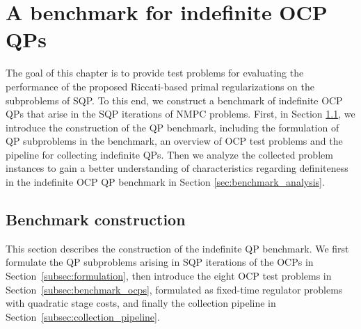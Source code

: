 \documentclass[class=scrbook, crop=false]{standalone}
\begin{document}
\chapter{A benchmark for indefinite OCP QPs} %
\label{Chapter::Benchmark}
The goal of this chapter is to provide test problems for evaluating the performance of the proposed Riccati-based primal regularizations
on the subproblems of \gls{SQP}.
To this end, we construct a benchmark of indefinite \gls{OCP} \glspl{QP}
that arise in the \gls{SQP} iterations of \gls{NMPC} problems.
First, in Section \ref{sec:benchmark_construction},
we introduce the construction of the \gls{QP} benchmark,
including the formulation of \gls{QP} subproblems in the benchmark, an overview of \gls{OCP} test problems 
and the pipeline for collecting indefinite \glspl{QP}.
Then we analyze the collected problem instances to gain a better understanding of characteristics
regarding definiteness in the indefinite \gls{OCP} \gls{QP} benchmark in Section \ref{sec:benchmark_analysis}.

\section{Benchmark construction}
\label{sec:benchmark_construction}
This section describes the construction of the indefinite \gls{QP} benchmark.
We first formulate the \gls{QP} subproblems arising in \gls{SQP} iterations of the \glspl{OCP} in Section~\ref{subsec:formulation},
then introduce the eight \gls{OCP} test problems in Section~\ref{subsec:benchmark_ocps},
formulated as fixed-time regulator problems with quadratic stage costs,
and finally the collection pipeline in Section~\ref{subsec:collection_pipeline}.
\end{document}

